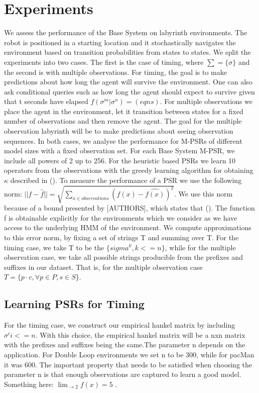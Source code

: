 \section{Experiments}

We assess the performance of the Base System on labyrinth environments. The robot is positioned in a starting location and it stochastically navigates the environment based on transition probabilities from states to states. We split the experiments into two cases. The first is the case of timing, where $\sum = \{\sigma\}$ and the second is with multiple observations. For timing, the goal is to make predictions about how long the agent will survive the environment. One can also ask conditional queries such as how long the agent should expect to survive given that t seconds have elapsed $f(\sigma^m|\sigma^n) = (eqns)$. For multiple observations we place the agent in the environment, let it transition between states for a fixed number of observations and then remove the agent. The goal for the multiple observation labyrinth will be to make predictions about seeing observation sequences. In both cases, we analyse the performance for M-PSRs of different model sizes with a fixed observation set. For each Base System M-PSR, we include all powers of 2 up to 256. For the heuristic based PSRs we learn 10 operators from the observations with the greedy learning algorithm for obtaining $\kappa$ described in (). To measure the performance of a PSR we use the following norm:
$||f - \hat{f}|| = \sqrt{\sum\nolimits_{x \in observations}(f(x) - \hat{f(x)})^2}$. We use this norm because of a bound presented by [AUTHORS], which states that (). The function f is obtainable explicitly for the environments which we consider as we have access to the underlying HMM of the environment. We compute approximations to this error norm, by fixing a set of strings T and summing over T. For the timing case, we take T to be the $\{sigma^k, k<=n\}$, while for the multiple observation case, we take all possible strings producible from the prefixes and suffixes in our dataset. That is, for the multiple observation case $T = \{p \cdot c, \forall p \in P, s \in S\}$.

\subsection{Learning PSRs for Timing}
For the timing case, we construct our empirical hankel matrix by including ${\sigma^i i<=n}$. With this choice, the empirical hankel matrix will be a nxn matrix with the prefixes and suffixes being the same.The parameter n depends on the application. For Double Loop environments we set n to be 300, while for pacMan it was 600. The important property that needs to be satisfied when choosing the parameter n is that enough observations are captured to learn a good model. Something here: $\lim_{ \to 2} f(x) = 5$ .

